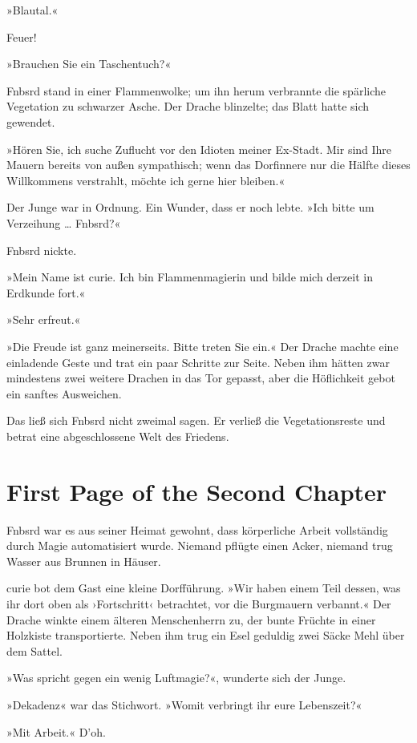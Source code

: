 »Blautal.«

Feuer!

»Brauchen Sie ein Taschentuch?«

Fnbsrd stand in einer Flammenwolke; um ihn herum verbrannte die spärliche Vegetation zu schwarzer Asche. Der Drache blinzelte; das Blatt hatte sich gewendet.

»Hören Sie, ich suche Zuflucht vor den Idioten meiner Ex-Stadt. Mir sind Ihre Mauern bereits von außen sympathisch; wenn das Dorfinnere nur die Hälfte dieses Willkommens verstrahlt, möchte ich gerne hier bleiben.«

Der Junge war in Ordnung. Ein Wunder, dass er noch lebte. »Ich bitte um Verzeihung … Fnbsrd?«

Fnbsrd nickte.

»Mein Name ist curie. Ich bin Flammenmagierin und bilde mich derzeit in Erdkunde fort.«

 »Sehr erfreut.«

»Die Freude ist ganz meinerseits. Bitte treten Sie ein.« Der Drache machte eine einladende Geste und trat ein paar Schritte zur Seite. Neben ihm hätten zwar mindestens zwei weitere Drachen in das Tor gepasst, aber die Höflichkeit gebot ein sanftes Ausweichen.

Das ließ sich Fnbsrd nicht zweimal sagen. Er verließ die Vegetationsreste und betrat eine abgeschlossene Welt des Friedens.


\chapter{First Page of the Second Chapter}

Fnbsrd war es aus seiner Heimat gewohnt, dass körperliche Arbeit vollständig durch Magie automatisiert wurde. Niemand pflügte einen Acker, niemand trug Wasser aus Brunnen in Häuser.

curie bot dem Gast eine kleine Dorfführung. »Wir haben einem Teil dessen, was ihr dort oben als ›Fortschritt‹ betrachtet, vor die Burgmauern verbannt.« Der Drache winkte einem älteren Menschenherrn zu, der bunte Früchte in einer Holzkiste transportierte. Neben ihm trug ein Esel geduldig zwei Säcke Mehl über dem Sattel.

»Was spricht gegen ein wenig Luftmagie?«, wunderte sich der Junge.

»Dekadenz« war das Stichwort. »Womit verbringt ihr eure Lebenszeit?«

»Mit Arbeit.« D’oh.

